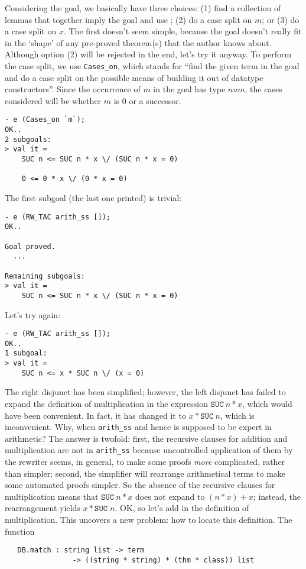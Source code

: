 Considering the goal, we basically have three choices: (1) find a
collection of lemmas that together imply the goal and use
; (2) do a case split on $m$; or (3) do a case split on
$x$. The first doesn't seem simple, because the goal doesn't really fit
in the `shape' of any pre-proved theorem(s) that the author knows
about. Although option (2) will be rejected in the end, let's try it
anyway. To perform the case split, we use \verb+Cases_on+, which stands
for ``find the given term in the goal and do a case split on the
possible means of building it out of datatype constructors''. Since the
occurrence of $m$ in the goal has type $num$, the cases considered will
be whether $m$ is $0$ or a successor.
\begin{session}
\begin{verbatim}
- e (Cases_on `m`);
OK..
2 subgoals:
> val it =
    SUC n <= SUC n * x \/ (SUC n * x = 0)

    0 <= 0 * x \/ (0 * x = 0)
\end{verbatim}
\end{session}
\noindent The first subgoal (the last one printed) is trivial:

\begin{session}
\begin{verbatim}
- e (RW_TAC arith_ss []);
OK..

Goal proved.
  ...

Remaining subgoals:
> val it =
    SUC n <= SUC n * x \/ (SUC n * x = 0)
\end{verbatim}
\end{session}
\noindent Let's try  again:
\begin{session}
\begin{verbatim}
- e (RW_TAC arith_ss []);
OK..
1 subgoal:
> val it =
    SUC n <= x * SUC n \/ (x = 0)
\end{verbatim}
\end{session}
The right disjunct has been simplified; however, the left disjunct has
failed to expand the definition of multiplication in the expression
$\mathtt{SUC}\ n * x$, which would have been convenient. In fact, it has
changed it to $x * \mathtt{SUC}\ n$, which is inconvenient. 
Why, when \verb+arith_ss+ and hence  is supposed to be expert in
arithmetic? The answer is twofold: first, the recursive clauses for addition and
multiplication are not in \verb+arith_ss+ because uncontrolled
application of them by the rewriter seems, in general, to make some
proofs \emph{more} complicated, rather than simpler; second, the simplifier
will rearrange arithmetical terms to make some automated proofs simpler. So
the absence of the recursive clauses for multiplication
means that $\mathtt{SUC}\ n * x$ does not expand to $(n * x) + x$;
instead, the rearrangement yields $x * \mathtt{SUC}\; n$. OK, so let's
add in the definition of multiplication. This uncovers a new problem: how
to locate this definition. The function
\begin{holboxed}
\begin{verbatim}
   DB.match : string list -> term
                -> ((string * string) * (thm * class)) list
\end{verbatim}
\end{holboxed}

